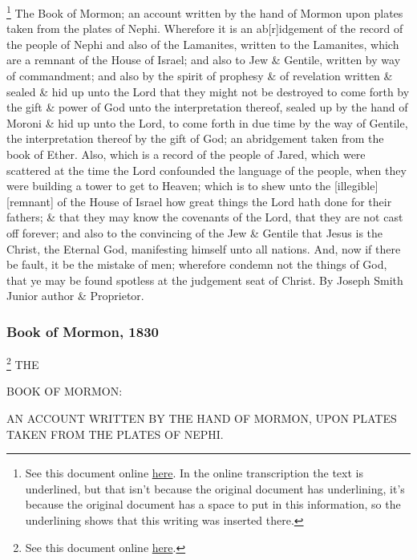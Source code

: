 		\footnote{%
			See this document online \href{https://www.josephsmithpapers.org/paper-summary/copyright-for-book-of-mormon-11-june-1829/1}{here}. In the online transcription the text is underlined, but that isn't because the original document has underlining, it's because the original document has a space to put in this information, so the underlining shows that this writing was inserted there.
			}%
		The Book of Mormon; an account written by the hand of Mormon upon plates taken from the plates of Nephi. Wherefore it is an ab[r]idgement of the record of the people of Nephi and also of the Lamanites, written to the Lamanites, which are a remnant of the House of Israel; and also to Jew \& Gentile, written by way of commandment; and also by the spirit of prophesy \& of revelation written \& sealed \& hid up unto the Lord that they might not be destroyed to come forth by the gift \& power of God unto the interpretation thereof, sealed up by the hand of Moroni \& hid up unto the Lord, to come forth in due time by the way of Gentile, the interpretation thereof by the gift of God; an abridgement taken from the book of Ether. Also, which is a record of the people of Jared, which were scattered at the time the Lord confounded the language of the people, when they were building a tower to get to Heaven; which is to shew unto the [illegible] [remnant] of the House of Israel how great things the Lord hath done for their fathers; \& that they may know the covenants of the Lord, that they are not cast off forever; and also to the convincing of the Jew \& Gentile that Jesus is the Christ, the Eternal God, manifesting himself unto all nations. And, now if there be fault, it be the mistake of men; wherefore condemn not the things of God, that ye may be found spotless at the judgement seat of Christ. By Joseph Smith Junior author \& Proprietor.
		
	\subsubsection{Book of Mormon, 1830}
	
		\begin{tightcenter}
		
				\footnote{%
					See this document online \href{https://www.josephsmithpapers.org/paper-summary/book-of-mormon-1830/1}{here}.
					}%
			THE
		
			BOOK OF MORMON:
			
			AN ACCOUNT WRITTEN BY THE HAND OF MORMON, UPON PLATES TAKEN FROM THE PLATES OF NEPHI.
			
		\end{tightcenter}
		 
